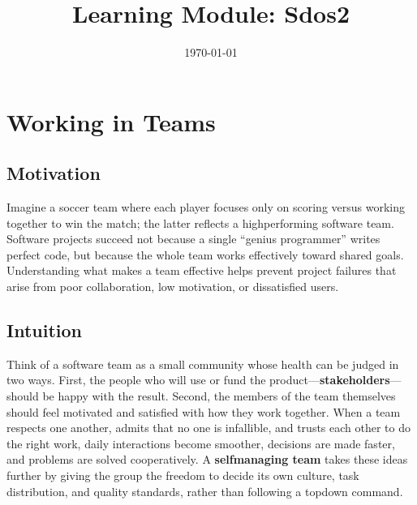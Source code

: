 \documentclass[12pt, a4paper]{article}
\title{Learning Module: Sdos2}
\author{}
\date{\today}
\begin{document}
\maketitle
\thispagestyle{empty}
\newpage

\tableofcontents
\newpage


\section{Working in Teams}

\subsection{Motivation}
Imagine a soccer team where each player focuses only on scoring versus working together to win the match; the latter reflects a highperforming software team.  
Software projects succeed not because a single ``genius programmer'' writes perfect code, but because the whole team works effectively toward shared goals.  
Understanding what makes a team effective helps prevent project failures that arise from poor collaboration, low motivation, or dissatisfied users.

\subsection{Intuition}
Think of a software team as a small community whose health can be judged in two ways.  
First, the people who will use or fund the product---\textbf{stakeholders}---should be happy with the result.  
Second, the members of the team themselves should feel motivated and satisfied with how they work together.  
When a team respects one another, admits that no one is infallible, and trusts each other to do the right work, daily interactions become smoother, decisions are made faster, and problems are solved cooperatively.  
A \textbf{selfmanaging team} takes these ideas further by giving the group the freedom to decide its own culture, task distribution, and quality standards, rather than following a topdown command.
\end{document}
